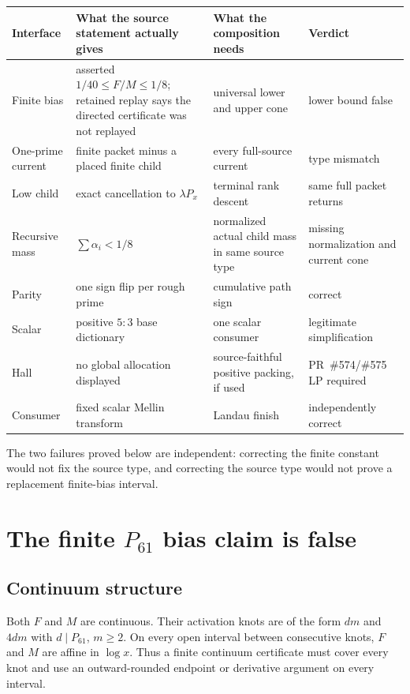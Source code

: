 \documentclass[11pt]{article}
\newcommand{\Psmall}{P_{61}}
\begin{document}
\begin{longtable}{@{}p{}p{}p{}p{}@{}}
\toprule
Interface & What the source statement actually gives & What the composition needs & Verdict \\
\midrule
\endhead
Finite bias & asserted $1/40\le F/M\le1/8$; retained replay says the directed certificate was not replayed & universal lower and upper cone & lower bound false \\
One-prime current & finite packet minus a placed finite child & every full-source current & type mismatch \\
Low child & exact cancellation to $\lambda P_x$ & terminal rank descent & same full packet returns \\
Recursive mass & $\sum\alpha_i<1/8$ & normalized actual child mass in same source type & missing normalization and current cone \\
Parity & one sign flip per rough prime & cumulative path sign & correct \\
Scalar & positive $5{:}3$ base dictionary & one scalar consumer & legitimate simplification \\
Hall & no global allocation displayed & source-faithful positive packing, if used & PR~\#574/\#575 LP required \\
Consumer & fixed scalar Mellin transform & Landau finish & independently correct \\
\bottomrule
\end{longtable}

The two failures proved below are independent: correcting the finite constant would not fix the source type, and correcting the source type would not prove a replacement finite-bias interval.

\section{The finite $P_{61}$ bias claim is false}

\subsection{Continuum structure}
Both $F$ and $M$ are continuous.  Their activation knots are of the form $dm$ and $4dm$ with $d\mid\Psmall$, $m\ge2$.  On every open interval between consecutive knots, $F$ and $M$ are affine in $\log x$.  Thus a finite continuum certificate must cover every knot and use an outward-rounded endpoint or derivative argument on every interval.
\end{document}
